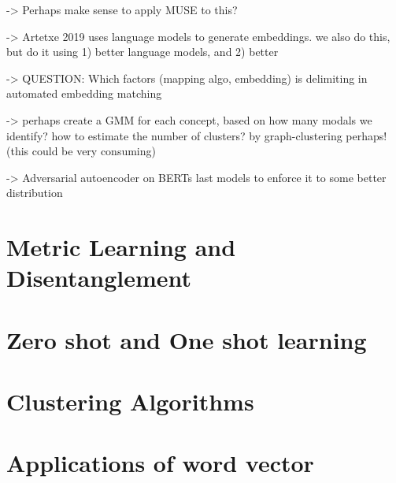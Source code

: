\documentclass[a4paper,12pt,twoside,openright]{report}
\begin{document}
-> Perhaps make sense to apply MUSE to this?

-> Artetxe 2019 uses language models to generate embeddings. we also do this, but do it using 1) better language models, and 2) better 

-> QUESTION: Which factors (mapping algo, embedding) is delimiting in automated embedding matching

-> perhaps create a GMM for each concept, based on how many modals we identify? how to estimate the number of clusters? by graph-clustering perhaps! (this could be very consuming)

-> Adversarial autoencoder on BERTs last models to enforce it to some better distribution

\section{Metric Learning and Disentanglement}

\section{Zero shot and One shot learning }

\section{Clustering Algorithms}

\section{Applications of word vector}
\end{document}
